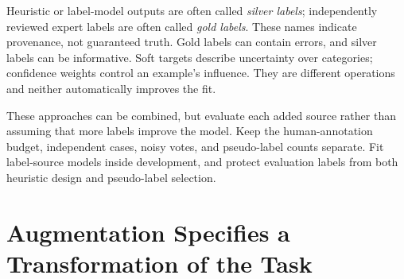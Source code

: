 Heuristic or label-model outputs are often called \emph{silver labels}; independently reviewed expert labels are often called \emph{gold labels}. These names indicate provenance, not guaranteed truth. Gold labels can contain errors, and silver labels can be informative. Soft targets describe uncertainty over categories; confidence weights control an example's influence. They are different operations and neither automatically improves the fit.

\par\addvspace{\intextsep}\noindent\begin{minipage}{\linewidth}
\centering
{}
\label{fig:label-acquisition-pipeline}
\end{minipage}\par\addvspace{\intextsep}

These approaches can be combined, but evaluate each added source rather than assuming that more labels improve the model. Keep the human-annotation budget, independent cases, noisy votes, and pseudo-label counts separate. Fit label-source models inside development, and protect evaluation labels from both heuristic design and pseudo-label selection.

\section{Augmentation Specifies a Transformation of the Task}

